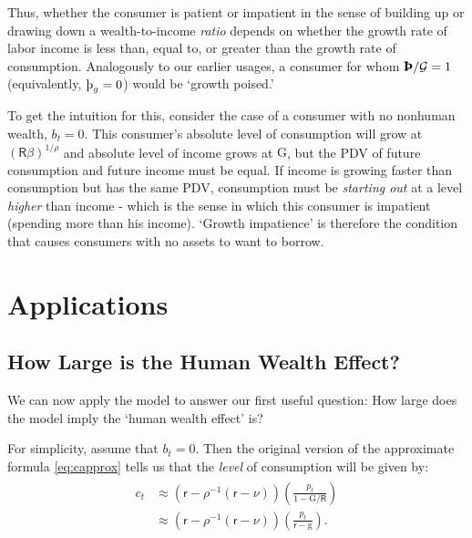 \documentclass{scrartcl}
\begin{document}
Thus, whether the consumer is patient or impatient in the sense of
building up or drawing down a wealth-to-income \textit{ratio} depends on
whether the growth rate of labor income is less than, equal to, or
greater than the growth rate of consumption.
Analogously to our
earlier usages, a consumer for whom $\text{\pmb{\Thorn}}/{\mathcal{G}}=1$ (equivalently, $\text{\thorn}_{g}= 0$) would be `growth poised.'

To get the intuition for this, consider the case of a consumer with no
nonhuman wealth, $b_{t}=0$.
This consumer's absolute level of
consumption will grow at $(\mathsf{R}\beta)^{1/\rho}$ and absolute
level of income grows at ${\ensuremath{\mathrm{G}}}$, but the PDV of future consumption
and future income must be equal.
If income is growing faster
than consumption but has the same PDV, consumption must be \textit{starting
out} at a level \textit{higher} than income - which is the sense in 
which this consumer is impatient (spending more than his income).
`Growth impatience' is
therefore the condition that causes consumers with no assets to want to borrow.

\section{Applications}

\subsection{How Large is the Human Wealth Effect?} \label{subsec:HWEffect}

We can now apply the model to answer our first useful question: How large does the model 
imply the `human wealth effect' is?


For simplicity, assume that $b_{t} = 0$.
Then the original
version of the approximate formula \eqref{eq:capprox} tells us that the
\textit{level} of consumption will be given by:
\begin{equation}\begin{gathered}\begin{aligned}
        \boldsymbol{\mathit{c}}_{t} & \approx  \left(\mathsf{r} - \rho^{-1}(\mathsf{r}-\nu)\right)\left(\frac{\boldsymbol{\mathit{p}}_{t}}{1-{\ensuremath{\mathrm{G}}}/\mathsf{R}}\right)  \\
         & \approx  \left(\mathsf{r} - \rho^{-1}(\mathsf{r}-\nu)\right)\left(\frac{\boldsymbol{\mathit{p}}_{t}}{\mathsf{r}-\mathrm{g}}\right). \label{eq:cofw2}
\end{aligned}\end{gathered}\end{equation}
\end{document}
